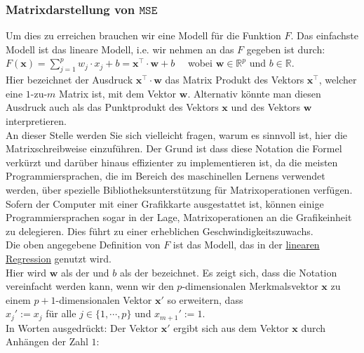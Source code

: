 \documentclass[12pt]{article}
\begin{document}
\subsubsection{Matrixdarstellung von $\mathtt{MSE}$}
%
Um dies zu erreichen brauchen wir eine Modell für die Funktion $F$.  Das einfachste Modell ist das lineare Modell, i.e. wir nehmen an das  $F$ gegeben ist durch: \\[0.2cm]
\hspace*{1.3cm}
$ F(\mathbf{x}) =  \sum\limits_{j=1}^p w_j \cdot x_j + b  =  \mathbf{x^\top} \cdot \mathbf{w} + b  \quad $ 
wobei $ \mathbf{w} \in {\mathbb{R}^p}$ und $ {b\in\mathbb{R}} $.
\\[0.2cm]
Hier bezeichnet der Ausdruck $\mathbf{x}^\top \cdot \mathbf{w}$ das Matrix Produkt des Vektors $\mathbf{x}^\top$, welcher eine $1$-zu-$m$ Matrix ist, mit dem Vektor $\mathbf{w}$. Alternativ könnte man diesen Ausdruck auch als das Punktprodukt des Vektors $\mathbf{x}$ und des Vektors $\mathbf{w}$ interpretieren.\\[0.2cm]
An dieser Stelle werden Sie sich vielleicht fragen, warum es sinnvoll ist, hier die Matrixschreibweise einzuführen. Der Grund ist dass diese Notation die Formel verkürzt und darüber hinaus effizienter zu implementieren ist, da die meisten Programmiersprachen, die im Bereich des maschinellen Lernens verwendet werden, über spezielle Bibliotheksunterstützung für Matrixoperationen verfügen.\\  
Sofern der Computer mit einer Grafikkarte ausgestattet ist, können einige
Programmiersprachen sogar in der Lage, Matrixoperationen an die Grafikeinheit zu delegieren. Dies führt zu einer erheblichen Geschwindigkeitszuwachs.\\[0.2cm]
%
Die oben angegebene Definition von $F$ ist das Modell, das in der
\href{https://en.wikipedia.org/wiki/Linear_regression}{linearen Regression} genutzt wird.\\ 
Hier wird $\mathbf{w}$ als der {\color{blue}{Gewichtsvektor}} und $b$ als der {\color{blue}{bias}} bezeichnet. Es zeigt sich, dass die Notation vereinfacht werden kann, wenn wir den $p$-dimensionalen Merkmalsvektor $\mathbf{x}$ zu einem
$p+1$-dimensionalen Vektor $\mathbf{x}'$ so erweitern, dass
\\[0.2cm]
\hspace*{1.3cm}
$x_j' := x_j$ \quad für alle $j\in\{1,\cdots,p\}$ \quad und \quad $x_{m+1}' := 1$.
\\[0.2cm]
In Worten ausgedrückt: Der Vektor $\mathbf{x}'$ ergibt sich aus dem Vektor $\mathbf{x}$ durch Anhängen der Zahl $1$:
\end{document}
